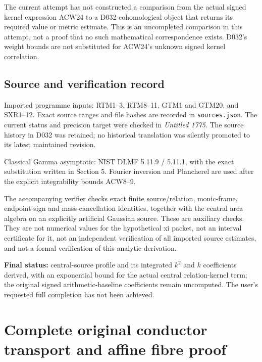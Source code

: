 The current attempt has not constructed a comparison from the actual signed kernel expression ACW24 to a D032 cohomological object that returns its required value or metric estimate. This is an uncompleted comparison in this attempt, not a proof that no such mathematical correspondence exists. D032's weight bounds are not substituted for ACW24's unknown signed kernel correlation.

\subsection{Source and verification record}\label{acw:source-and-verification-record}

Imported programme inputs: RTM1--3, RTM8--11, GTM1 and GTM20, and SXR1--12. Exact source ranges and file hashes are recorded in \texttt{sources.json}. The current status and precision target were checked in \emph{Untitled 1775}. The source history in D032 was retained; no historical translation was silently promoted to its latest maintained revision.

Classical Gamma asymptotic: NIST DLMF 5.11.9 / 5.11.1, with the exact substitution written in Section 5. Fourier inversion and Plancherel are used after the explicit integrability bounds ACW8--9.

The accompanying verifier checks exact finite source/relation, monic-frame, endpoint-sign and mass-cancellation identities, together with the central area algebra on an explicitly artificial Gaussian source. These are auxiliary checks. They are not numerical values for the hypothetical xi packet, not an interval certificate for it, not an independent verification of all imported source estimates, and not a formal verification of this analytic derivation.

\textbf{Final status:} central-source profile and its integrated \(k^2\) and \(k\) coefficients derived, with an exponential bound for the actual central relation-kernel term; the original signed arithmetic-baseline coefficients remain uncomputed. The user's requested full completion has not been achieved.

\endgroup

\clearpage
\begingroup


\setcounter{equation}{0}
\renewcommand{\theequation}{LRC.\arabic{equation}}
\section*{Complete original conductor transport and affine fibre proof}
\begingroup
